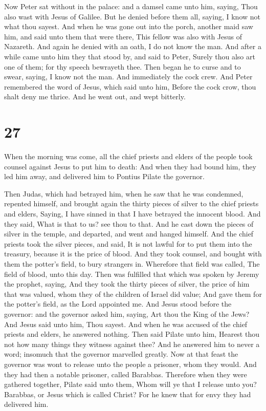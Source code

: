  Now Peter sat without in the palace: and a damsel came
unto him, saying, Thou also wast with Jesus of Galilee. 
But he denied before them all, saying, I know not what thou sayest.
 And when he was gone out into the porch, another maid saw
him, and said unto them that were there, This fellow was also with Jesus
of Nazareth.  And again he denied with an oath, I do not
know the man.  And after a while came unto him they that
stood by, and said to Peter, Surely thou also art one of them; for thy
speech bewrayeth thee.  Then began he to curse and to
swear, saying, I know not the man. And immediately the cock crew.
 And Peter remembered the word of Jesus, which said unto
him, Before the cock crow, thou shalt deny me thrice. And he went out,
and wept bitterly.

\hypertarget{section-26}{%
\section{27}\label{section-26}}

 When the morning was come, all the chief priests and elders
of the people took counsel against Jesus to put him to death:
 And when they had bound him, they led him away, and
delivered him to Pontius Pilate the governor.

 Then Judas, which had betrayed him, when he saw that he was
condemned, repented himself, and brought again the thirty pieces of
silver to the chief priests and elders,  Saying, I have
sinned in that I have betrayed the innocent blood. And they said, What
is that to us? see thou to that.  And he cast down the
pieces of silver in the temple, and departed, and went and hanged
himself.  And the chief priests took the silver pieces, and
said, It is not lawful for to put them into the treasury, because it is
the price of blood.  And they took counsel, and bought with
them the potter's field, to bury strangers in.  Wherefore
that field was called, The field of blood, unto this day. 
Then was fulfilled that which was spoken by Jeremy the prophet, saying,
And they took the thirty pieces of silver, the price of him that was
valued, whom they of the children of Israel did value;  And
gave them for the potter's field, as the Lord appointed me.
 And Jesus stood before the governor: and the governor
asked him, saying, Art thou the King of the Jews? And Jesus said unto
him, Thou sayest.  And when he was accused of the chief
priests and elders, he answered nothing.  Then said Pilate
unto him, Hearest thou not how many things they witness against thee?
 And he answered him to never a word; insomuch that the
governor marvelled greatly.  Now at that feast the governor
was wont to release unto the people a prisoner, whom they would.
 And they had then a notable prisoner, called Barabbas.
 Therefore when they were gathered together, Pilate said
unto them, Whom will ye that I release unto you? Barabbas, or Jesus
which is called Christ?  For he knew that for envy they had
delivered him.

